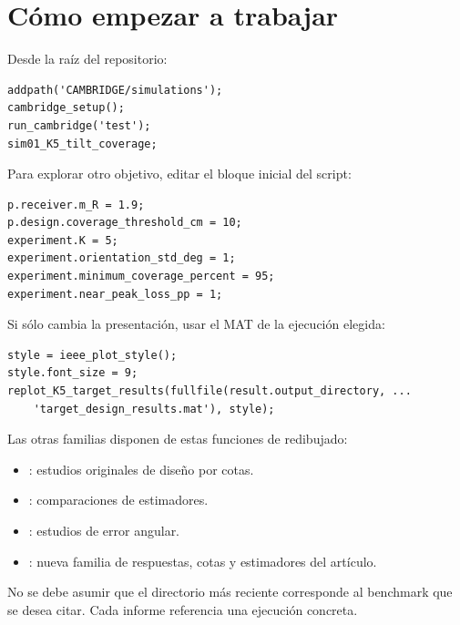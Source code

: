 \documentclass[11pt,a4paper]{article}
\begin{document}
\section{Cómo empezar a trabajar}
Desde la raíz del repositorio:
\begin{verbatim}
addpath('CAMBRIDGE/simulations');
cambridge_setup();
run_cambridge('test');
sim01_K5_tilt_coverage;
\end{verbatim}
Para explorar otro objetivo, editar el bloque inicial del script:
\begin{verbatim}
p.receiver.m_R = 1.9;
p.design.coverage_threshold_cm = 10;
experiment.K = 5;
experiment.orientation_std_deg = 1;
experiment.minimum_coverage_percent = 95;
experiment.near_peak_loss_pp = 1;
\end{verbatim}
Si sólo cambia la presentación, usar el MAT de la ejecución elegida:
\begin{verbatim}
style = ieee_plot_style();
style.font_size = 9;
replot_K5_target_results(fullfile(result.output_directory, ...
    'target_design_results.mat'), style);
\end{verbatim}
Las otras familias disponen de estas funciones de redibujado:
\begin{itemize}
\item {}: estudios originales de diseño por cotas.
\item {}: comparaciones de estimadores.
\item {}: estudios de error angular.
\item {}: nueva familia de respuestas, cotas y estimadores del artículo.
\end{itemize}
No se debe asumir que el directorio más reciente corresponde al benchmark que se desea citar. Cada informe referencia una ejecución concreta.
\end{document}
